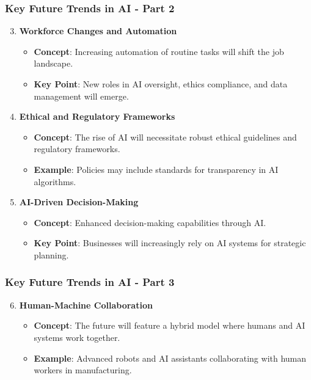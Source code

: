 \documentclass[aspectratio=169]{beamer}
\begin{document}
\begin{frame}[fragile]
    \frametitle{Key Future Trends in AI - Part 2}
    \begin{enumerate}
        \setcounter{enumi}{2}
        \item \textbf{Workforce Changes and Automation}
        \begin{itemize}
            \item \textbf{Concept}: Increasing automation of routine tasks will shift the job landscape.
            \item \textbf{Key Point}: New roles in AI oversight, ethics compliance, and data management will emerge.
        \end{itemize}
        
        \item \textbf{Ethical and Regulatory Frameworks}
        \begin{itemize}
            \item \textbf{Concept}: The rise of AI will necessitate robust ethical guidelines and regulatory frameworks.
            \item \textbf{Example}: Policies may include standards for transparency in AI algorithms.
        \end{itemize}

        \item \textbf{AI-Driven Decision-Making}
        \begin{itemize}
            \item \textbf{Concept}: Enhanced decision-making capabilities through AI.
            \item \textbf{Key Point}: Businesses will increasingly rely on AI systems for strategic planning.
        \end{itemize}
    \end{enumerate}
\end{frame}

\begin{frame}[fragile]
    \frametitle{Key Future Trends in AI - Part 3}
    \begin{enumerate}
        \setcounter{enumi}{5}
        \item \textbf{Human-Machine Collaboration}
        \begin{itemize}
            \item \textbf{Concept}: The future will feature a hybrid model where humans and AI systems work together.
            \item \textbf{Example}: Advanced robots and AI assistants collaborating with human workers in manufacturing.
        \end{itemize}
    \end{enumerate}
\end{frame}
\end{document}
